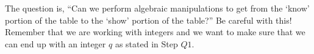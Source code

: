 \begin{previewactivity}
The question is, ``Can we perform algebraic manipulations to get from the `know' portion of the table to the `show' portion of the table?''
Be careful with this!  Remember that we are working with integers and we want to make sure that we can end up with an integer  $q$  as stated in Step $Q1$.
\end{previewactivity}

\endinput
